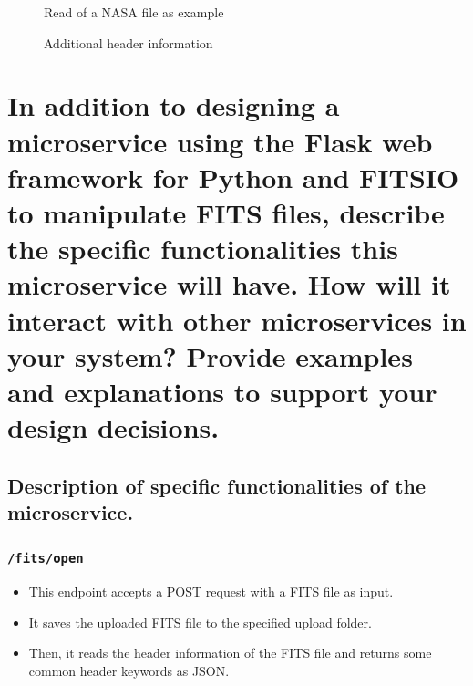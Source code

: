 \documentclass[a4paper,oneside,11pt]{book}
\begin{document}
\begin{itemize}
\begin{figure}[h]
        \caption{Read of a NASA file as example}
    \end{figure}
    \begin{figure}[h]
        \centering
        \caption{Additional header information}
    \end{figure}
    \clearpage
\end{itemize}
\section{In addition to designing a microservice using the Flask web framework for Python and
FITSIO to manipulate FITS files, describe the specific functionalities this microservice
will have. How will it interact with other microservices in your system? Provide
examples and explanations to support your design decisions.}
\subsection{Description of specific functionalities of the microservice.}
\subsubsection{\texttt{/fits/open}}
\begin{itemize}
    \item This endpoint accepts a POST request with a FITS file as input.
    \item It saves the uploaded FITS file to the specified upload folder.
    \item Then, it reads the header information of the FITS file and returns some common header keywords as JSON.
\end{itemize}
\end{document}
